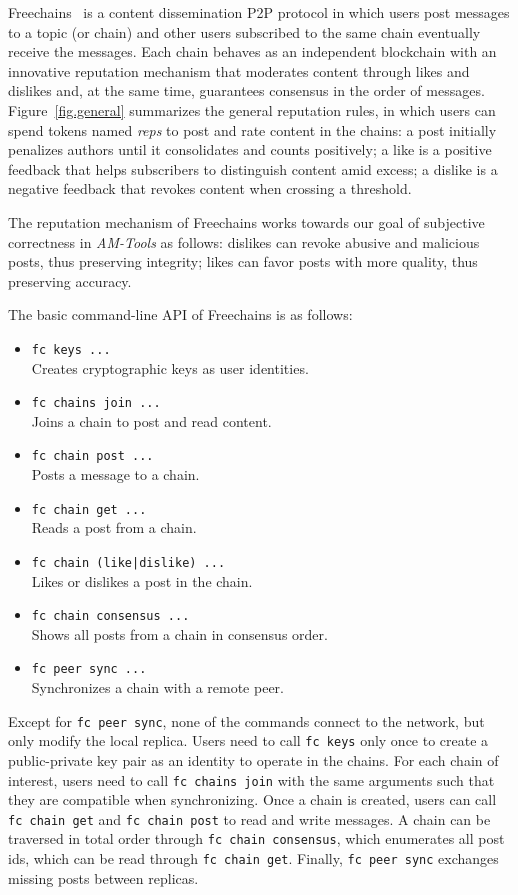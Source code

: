 \documentclass[12pt]{article}
\newcommand{\AMT}      {\emph{AM-Tools}\xspace}
\newcommand{\code}[1]  {\texttt{\footnotesize{#1}}}
\begin{document}
Freechains~\cite{fcs.sbseg20} is a content dissemination P2P protocol in which
users post messages to a topic (or chain) and other users subscribed to the
same chain eventually receive the messages.
%
Each chain behaves as an independent blockchain with an innovative reputation
mechanism that moderates content through likes and dislikes and, at the same
time, guarantees consensus in the order of messages.
%
Figure~\ref{fig.general} summarizes the general reputation rules, in which
users can spend tokens named \emph{reps} to post and rate content in the
chains:
    a post initially penalizes authors until it consolidates and counts positively;
    a like is a positive feedback that helps subscribers to distinguish content amid excess;
    a dislike is a negative feedback that revokes content when crossing a threshold.

The reputation mechanism of Freechains works towards our goal of subjective
correctness in \AMT as follows:
    dislikes can revoke abusive and malicious posts, thus preserving integrity;
    likes can favor posts with more quality, thus preserving accuracy.

The basic command-line API of Freechains is as follows:

\begin{itemize}
\item \code{fc keys ...} \\
    Creates cryptographic keys as user identities.
\item \code{fc chains join ...} \\
    Joins a chain to post and read content.
\item \code{fc chain post ...} \\
    Posts a message to a chain.
\item \code{fc chain get ...} \\
    Reads a post from a chain.
\item \code{fc chain (like|dislike) ...} \\
    Likes or dislikes a post in the chain.
\item \code{fc chain consensus ...} \\
    Shows all posts from a chain in consensus order.
\item \code{fc peer sync ...} \\
    Synchronizes a chain with a remote peer.
\end{itemize}

Except for \code{fc~peer~sync}, none of the commands connect to the network,
but only modify the local replica.
%
Users need to call \code{fc~keys} only once to create a public-private key pair
as an identity to operate in the chains.
%
For each chain of interest, users need to call \code{fc~chains~join} with the
same arguments such that they are compatible when synchronizing.
%
Once a chain is created, users can call \code{fc~chain~get} and
\code{fc~chain~post} to read and write messages.
%
A chain can be traversed in total order through \code{fc~chain~consensus},
which enumerates all post ids, which can be read through \code{fc~chain~get}.
%
Finally, \code{fc~peer~sync} exchanges missing posts between replicas.
\end{document}
